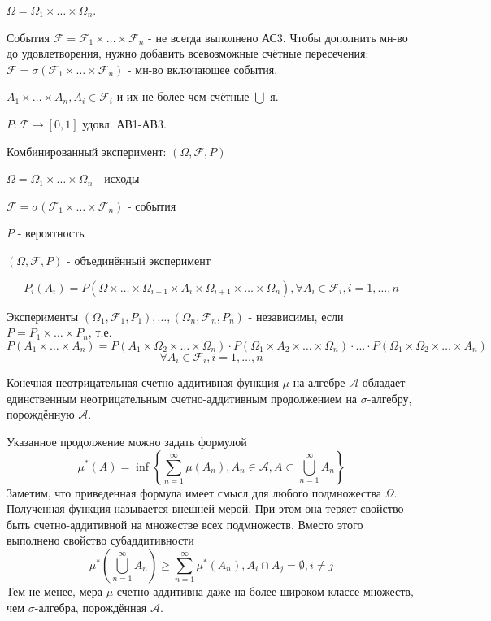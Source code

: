 $\Omega = \Omega_1 \times \dots \times \Omega_n$.

События $\mathcal{F} = \mathcal{F}_1 \times \dots \times \mathcal{F}_n$ - не всегда выполнено АС3. Чтобы дополнить мн-во до удовлетворения, нужно добавить всевозможные счётные пересечения: $\mathcal{F} = \sigma(\mathcal{F}_1 \times \dots \times \mathcal{F}_n)$ - мн-во включающее события.

$A_1 \times \dots \times A_n, A_i \in \mathcal{F}_i$ и их не более чем счётные $\bigcup$-я.

$P: \mathcal{F} \to [0,1]$ удовл. АВ1-АВ3.

Комбинированный эксперимент: $(\Omega, \mathcal{F}, P)$

$\Omega = \Omega_1 \times \dots \times \Omega_n$ - исходы

$\mathcal{F} = \sigma(\mathcal{F}_1 \times \dots \times \mathcal{F}_n)$ - события

$P$ - вероятность

$(\Omega, \mathcal{F}, P)$ - объединённый эксперимент

\begin{definition}
	\[ P_i(A_i) = P(\Omega \times \dots \times \Omega_{i-1} \times A_i \times \Omega_{i+1} \times \dots \times \Omega_n), \forall A_i \in \mathcal{F}_i, i = 1, \dots, n \]
\end{definition}

\begin{definition}
	Эксперименты $(\Omega_1, \mathcal{F}_1, P_1), \dots, (\Omega_n, \mathcal{F}_n, P_n)$ - независимы, если $P = P_1 \times \dots \times P_n$, т.е.
	\[ P(A_1 \times \dots \times A_n) = P(A_1 \times \Omega_2 \times \dots \times \Omega_n) \cdot P(\Omega_1 \times A_2 \times \dots \times \Omega_n) \cdot ... \cdot P(\Omega_1 \times \Omega_2 \times \dots \times A_n) \]
	\[ \forall A_i \in \mathcal{F}_i, i = 1, \dots, n \]
\end{definition}

\begin{theorem}
	Конечная неотрицательная счетно-аддитивная функция $\mu$ на алгебре $\mathcal{A}$ обладает единственным неотрицательным счетно-аддитивным продолжением на $\sigma$-алгебру, порождённую $\mathcal{A}$.
	
	Указанное продолжение можно задать формулой
	\[ \mu^* (A) = \inf \left\{ \sum_{n=1}^{\infty} \mu (A_n), A_n \in \mathcal{A}, A \subset \bigcup_{n=1}^{\infty} A_n \right\} \]
	Заметим, что приведенная формула имеет смысл для любого подмножества $\Omega$. Полученная функция называется внешней мерой. При этом она теряет свойство быть счетно-аддитивной на множестве всех подмножеств. Вместо этого выполнено свойство субаддитивности
	\[ \mu^* \left( \bigcup_{n=1}^{\infty} A_n \right) \ge \sum_{n=1}^{\infty} \mu^* (A_n), A_i \cap A_j = \emptyset, i \ne j \]
	Тем не менее, мера $\mu$ счетно-аддитивна даже на более широком классе множеств, чем $\sigma$-алгебра, порождённая $\mathcal{A}$.
\end{theorem}

